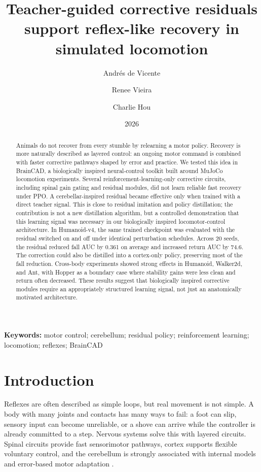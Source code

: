 \documentclass[11pt]{article}
\title{Teacher-guided corrective residuals support reflex-like recovery in simulated locomotion}
\author[1,*]{Andr\'es de Vicente}
\author[1,*]{Renee Vieira}
\author[1,*]{Charlie Hou}
\affil[1]{Neuromatch Impact Scholars Program, Team RNNematode}
\affil[*]{Equal contribution}
\date{2026}
\begin{document}
\maketitle

\textbf{Keywords:} motor control; cerebellum; residual policy; reinforcement learning; locomotion; reflexes; BrainCAD

\begin{abstract}
Animals do not recover from every stumble by relearning a motor policy.  Recovery is more naturally described as layered control: an ongoing motor command is combined with faster corrective pathways shaped by error and practice.  We tested this idea in BrainCAD, a biologically inspired neural-control toolkit built around MuJoCo locomotion experiments.  Several reinforcement-learning-only corrective circuits, including spinal gain gating and residual modules, did not learn reliable fast recovery under PPO.  A cerebellar-inspired residual became effective only when trained with a direct teacher signal.  This is close to residual imitation and policy distillation; the contribution is not a new distillation algorithm, but a controlled demonstration that this learning signal was necessary in our biologically inspired locomotor-control architecture.  In Humanoid-v4, the same trained checkpoint was evaluated with the residual switched on and off under identical perturbation schedules.  Across 20 seeds, the residual reduced fall AUC by 0.361 on average and increased return AUC by 74.6.  The correction could also be distilled into a cortex-only policy, preserving most of the fall reduction.  Cross-body experiments showed strong effects in Humanoid, Walker2d, and Ant, with Hopper as a boundary case where stability gains were less clean and return often decreased.  These results suggest that biologically inspired corrective modules require an appropriately structured learning signal, not just an anatomically motivated architecture.
\end{abstract}

\section*{Introduction}
Reflexes are often described as simple loops, but real movement is not simple.  A body with many joints and contacts has many ways to fail: a foot can slip, sensory input can become unreliable, or a shove can arrive while the controller is already committed to a step.  Nervous systems solve this with layered circuits.  Spinal circuits provide fast sensorimotor pathways, cortex supports flexible voluntary control, and the cerebellum is strongly associated with internal models and error-based motor adaptation \citep{wolpert1998internalmodels,ito2008control,seidler2013errorbased}.
\end{document}
